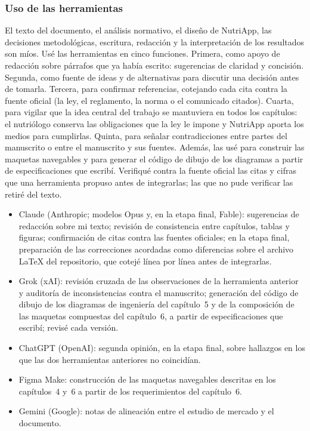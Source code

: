 \documentclass[12pt, a4paper]{article}
\begin{document}
\subsubsection*{Uso de las herramientas}
 
El texto del documento, el análisis normativo, el diseño de NutriApp,
las decisiones metodológicas, escritura, redacción y la interpretación de los resultados son
míos. Usé las herramientas en cinco funciones. Primera, como
apoyo de redacción sobre párrafos que ya había escrito: sugerencias
de claridad y concisión. Segunda, como fuente de ideas y de alternativas para discutir
una decisión antes de tomarla. Tercera, para confirmar referencias,
cotejando cada cita contra la fuente oficial (la ley, el reglamento, la
norma o el comunicado citados). Cuarta, para vigilar que la idea central
del trabajo se mantuviera en todos los capítulos: el nutriólogo conserva
las obligaciones que la ley le impone y NutriApp aporta los medios para
cumplirlas. Quinta, para señalar contradicciones entre partes
del manuscrito o entre el manuscrito y sus fuentes. Además, las usé
para construir las maquetas navegables y para generar el código de
dibujo de los diagramas a partir de especificaciones que escribí.
Verifiqué contra la fuente oficial las citas y cifras que una
herramienta propuso antes de integrarlas; las que no pude
verificar las retiré del texto.
 
\begin{itemize}
  \item Claude (Anthropic; modelos Opus y, en la etapa final, Fable):
    sugerencias de redacción sobre mi texto; revisión de
    consistencia entre capítulos, tablas y figuras; confirmación de
    citas contra las fuentes oficiales; en la etapa final, preparación
    de las correcciones acordadas como diferencias sobre el archivo
    \LaTeX{} del repositorio, que cotejé línea por línea antes
    de integrarlas.
  \item Grok (xAI): revisión cruzada de las observaciones de la
    herramienta anterior y auditoría de inconsistencias contra el
    manuscrito; generación del código de dibujo de los diagramas de
    ingeniería del capítulo~5 y de la composición de las maquetas
    compuestas del capítulo~6, a partir de especificaciones que escribí;
    revisé cada versión.
  \item ChatGPT (OpenAI): segunda opinión, en la etapa final, sobre
    hallazgos en los que las dos herramientas anteriores no coincidían.
  \item Figma Make: construcción de las maquetas navegables descritas
    en los capítulos~4 y~6 a partir de los requerimientos del
    capítulo~6.
  \item Gemini (Google): notas de alineación entre el estudio de
    mercado y el documento.
\end{itemize}
 
\end{document}
